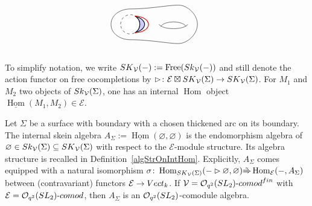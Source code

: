 \documentclass[11pt]{article}
\numberwithin{equation}{section}
\numberwithin{equation}{section}
\newcommand{\Free}{\operatorname{Free}}
\newcommand{\Hom}{\operatorname{Hom}}
\newcommand{\undHom}{\underline{\operatorname{Hom}}}
\newcommand{\Oq}{\mathcal{O}_{q^2}({\rm SL}_2)}
\begin{document}
$$\begin{tikzpicture}[yscale = 0.8, xscale = -0.8]
\begin{scope}[yshift = -3cm, xshift = 1cm]
\fill[white] (0.6,0.9) .. controls (0.7,0.7) and (1.8,0.7) .. (1.9,0.9) .. controls (1.7,1.2) and (0.8,1.2) .. (0.6,0.9);
\fill[white] (3.5,1) circle(0.5);
\fill[blue!20] (240:0.5)++(3.5,1) arc(240:120:0.5) arc(120:240:1 and 0.5);
\draw[dashed] (3.5,1) circle(0.5);
\draw[thick] (240:0.5)++(3.5,1) arc(240:120:0.5);
\draw[thick] (240:0.5)++(3.5,1) arc(240:120:1 and 0.5);
\draw[thick, red] (240:0.5)++(3.5,1) arc(270:90:0.7 and 0.43);
\draw (0.5,1) .. controls (0.7,0.7) and (1.8,0.7) .. (2,1);
\draw (0.6,0.9) .. controls (0.8,1.2) and (1.7,1.2) .. (1.9,0.9) node[midway, above right]{};
\draw (4.5,1) .. controls (4.5,0.5) and (4,0.2) .. (3.5,0.2)	.. controls (2.5,0.2) and (1.5,0 ) .. (1,0)	.. controls (0.5,0 ) and (0,0.5 ) .. (0,1)	.. controls (0,1.5 ) and (0.5,2 ) .. (1,2)	.. controls (1.5,2 ) and (2.5,1.8) .. (3.5,1.8) .. controls (4,1.8) and (4.5,1.5) .. (4.5,1);
\end{scope}
\end{tikzpicture}
$$
To simplify notation, we write ${\rm SK}_\mathcal{V}(-) := \Free({\rm Sk}_\mathcal{V}(-))$ and still denote the action functor on free cocompletions by $\rhd\colon \mathcal{E} \boxtimes {\rm SK}_\mathcal{V}(\Sigma)\to {\rm SK}_\mathcal{V}(\Sigma)$. For $M_1$ and $M_2$ two objects of ${\rm Sk}_\mathcal{V}(\Sigma)$, one has an internal $\Hom$ object $\undHom(M_1,M_2) \in \mathcal{E}$.

\begin{Definition}
Let $\Sigma$ be a surface with boundary with a chosen thickened arc on its boundary.
The internal skein algebra $A_\Sigma := \undHom(\varnothing,\varnothing)$ is the endomorphism algebra of $\varnothing \in {\rm Sk}_\mathcal{V}(\Sigma) \subseteq {\rm SK}_\mathcal{V}(\Sigma)$ with respect to the $\mathcal{E}$-module structure. Its algebra structure is recalled in Definition~\ref{algStrOnIntHom}.
Explicitly, $A_\Sigma$ comes equipped with a natural isomorphism $\sigma \colon \Hom_{{\rm SK}_\mathcal{V}(\Sigma)}(-\rhd \varnothing, \varnothing) \tilde{\Rightarrow} \Hom_{\mathcal{E}}(-, A_\Sigma)$ between (contravariant) functors $\mathcal{E}\to {\rm Vect}_k$.
If $\mathcal{V} = \Oq\text{-}{\rm comod}^{\rm fin}$ with $\mathcal{E}=\Oq\text{-}{\rm comod}$, then $A_\Sigma$ is an $\Oq$-comodule algebra.
\end{Definition}
\end{document}
